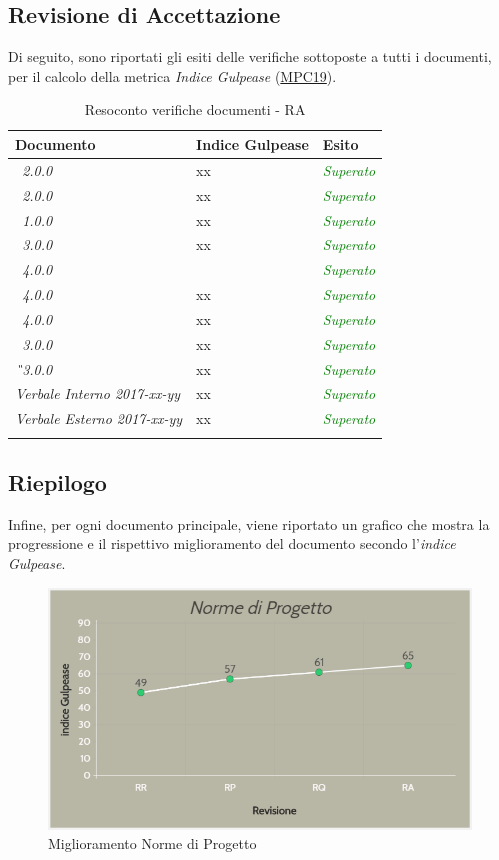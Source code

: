 \newpage
\subsection{Revisione di Accettazione}
Di seguito, sono riportati gli esiti delle verifiche sottoposte a tutti i documenti, per il calcolo della metrica \textit{Indice Gulpease} (\hyperlink{MPC19}{MPC19}).

\begin{longtable}{|>{\centering\arraybackslash}p{5.7cm}|>{\centering\arraybackslash}p{5cm} | >{\centering\arraybackslash}p{5cm}|}
	\hline
	\rowcolor{Gray}
	\textbf{Documento} & \textbf{Indice Gulpease} & \textbf{Esito} \\
	\hline
	\textit{\DDP\ 2.0.0} & xx & \textcolor{Green}{\textit{Superato}}\\
	\hline
	\textit{\MU\ 2.0.0} & xx & \textcolor{Green}{\textit{Superato}}\\
	\hline
	\textit{\MS\ 1.0.0} & xx & \textcolor{Green}{\textit{Superato}}\\
	\hline
	\textit{\ST\ 3.0.0} & xx  & \textcolor{Green}{\textit{Superato}}\\
	\hline
	\textit{\NdP\ 4.0.0} & 65  & \textcolor{Green}{\textit{Superato}}\\
	\hline
	\textit{\PdP\ 4.0.0} & xx & \textcolor{Green}{\textit{Superato}} \\
	\hline
	\textit{\PdQ\ 4.0.0} &  xx & \textcolor{Green}{\textit{Superato}}\\
	\hline
	\textit{\AdR\ 3.0.0} &  xx & \textcolor{Green}{\textit{Superato}} \\
	\hline
	\textit{\G\ 3.0.0}& xx & \textcolor{Green}{\textit{Superato}}\\
	\hline
	\textit{Verbale Interno 2017-xx-yy}		& 	xx	&	\textcolor{Green}{\textit{Superato}}	\\
	\hline
	\textit{Verbale Esterno 2017-xx-yy}		& 	xx	&	\textcolor{Green}{\textit{Superato}}	\\
	\hline
	
	\caption{Resoconto verifiche documenti - RA}
\end{longtable}

\subsection{Riepilogo}
Infine, per ogni documento principale, viene riportato un grafico che mostra la progressione e il rispettivo miglioramento del documento secondo l'\textit{indice Gulpease}.

\begin{figure}[H]
	\centering
	\includegraphics[scale=0.6]{includes/img/NdP.png}
	\caption{Miglioramento Norme di Progetto}
\end{figure}

